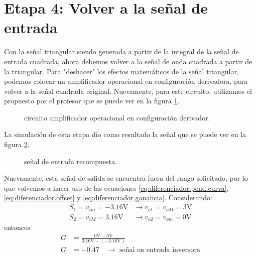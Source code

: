 \section{Etapa 4: Volver a la señal de entrada}
Con la señal triangular siendo generada a partir de la integral de la señal de entrada cuadrada, ahora debemos
volver a la señal de onda cuadrada a partir de la triangular. Para "deshacer" los efectos matemáticos de la señal
triangular, podemos colocar un amplificador operacional en configuración derivadora, para volver a la señal
cuadrada original. Nuevamente, para este circuito, utilizamos el propuesto por el profesor que se puede ver en la
figura \ref{crkt:derivador}.

\begin{figure}[!ht]
  \centering
  
  \caption{circuito amplificador operacional en configuración derivador.}
  \label{crkt:derivador}
\end{figure}

La simulación de esta etapa dio como resultado la señal que se puede ver en la figura \ref{plot:derivated_pre}.

\begin{figure}[!ht]
  \centering
  
  \caption{señal de entrada recompuesta.}
  \label{plot:derivated_pre}
\end{figure}

Nuevamente, esta señal de salida se encuentra fuera del rango solicitado, por lo que volvemos a hacer uso de las
ecuaciones \ref{eq:diferenciador.pend.curva}, \ref{eq:diferenciador.offset} y \ref{eq:diferenciador.ganancia}.
Considerando:
\begin{align*}
  S_1 = v_{im} = -3.16 \si{\volt} &\to v_{o1} = v_{oM} = 3 \si{\volt} \\
  S_2 = v_{iM} = 3.16 \si{\volt} &\to v_{o2} = v_{om} = 0 \si{\volt}
\end{align*}
entonces:
\begin{align*}
  G &= \frac{0 \si{\volt} - 3\si{\volt}}{3.16\si{\volt} - (-3.16\si{\volt})} \\
  G &= -0.47 \quad \to \text{ señal en entrada inversora}
\end{align*}

